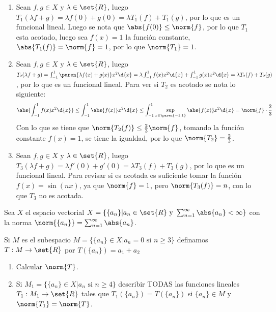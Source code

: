 \begin{sol}
    \begin{enumerate}
        \item Sean \(f,g\in X\) y \(\lambda\in\set{R}\), luego \(T_1(\lambda f+g)=\lambda f(0)+g(0)=\lambda T_1(f)+T_1(g)\), por lo que es un funcional lineal. Luego se nota que \(\abs{f(0)}\leq\norm{f}\), por lo que \(T_1\) esta acotado, luego sea \(f(x)=1\) la función constante, \(\abs{T_1(f)}=\norm{f}=1\), por lo que \(\norm{T_1}=1\).
        \item Sean \(f,g\in X\) y \(\lambda\in\set{R}\), luego \(T_2(\lambda f+g)=\int_{-1}^1\paren{\lambda f(x)+g(x)}x^2\d{x}=\lambda\int_{-1}^1f(x)x^2\d{x}+\int_{-1}^1g(x)x^2\d{x}=\lambda T_2(f)+T_2(g)\), por lo que es un funcional lineal. Para ver si \(T_2\) es acotado se nota lo siguiente:
        \[\abs{\int_{-1}^1f(x)x^2\d{x}}\leq\int_{-1}^1\abs{f(x)}x^2\d{x}\leq\int_{-1}^1\sup_{x\in\paren{-1,1}}\abs{f(x)}x^2\d{x}=\norm{f}\cdot\frac23\]
        Con lo que se tiene que \(\norm{T_2(f)}\leq\frac23\norm{f}\), tomando la función constante \(f(x)=1\), se tiene la igualdad, por lo que \(\norm{T_2}=\frac23\).
        \item Sean \(f,g\in X\) y \(\lambda\in\set{R}\), luego \(T_3(\lambda f+g)=\lambda f'(0)+g'(0)=\lambda T_3(f)+T_3(g)\), por lo que es un funcional lineal. Para revisar si es acotada es suficiente tomar la función \(f(x)=\sin(nx)\), ya que \(\norm{f}=1\), pero \(\norm{T_3(f)}=n\), con lo que \(T_3\) no es acotada.
    \end{enumerate}
\end{sol}

\begin{prob}
    Sea \(X\) el espacio vectorial \(X=\{\{a_n\}|a_n\in\set{R}\text{ y }\sum_{n=1}^\infty\abs{a_n}<\infty\}\) con la norma \(\norm{\{a_n\}}=\sum_{n=1}^\infty\abs{a_n}\).

    Si \(M\) es el subespacio \(M=\{\{a_n\}\in X|a_n=0\text{ si }n\geq3\}\) definamos \(T:M\rightarrow\set{R}\) por \(T(\{a_n\})=a_1+a_2\)
    \begin{enumerate}
        \item Calcular \(\norm{T}\).
        \item Si \(M_1=\{\{a_n\}\in X|a_n\text{ si }n\geq4\}\) describir TODAS las funciones lineales \(T_1:M_1\rightarrow\set{R}\) tales que \(T_1(\{a_n\})=T(\{a_n\})\) si \(\{a_n\}\in M\) y \(\norm{T_1}=\norm{T}\).
    \end{enumerate}
\end{prob}

